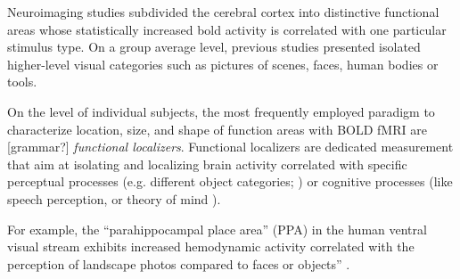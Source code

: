 



Neuroimaging studies subdivided the cerebral cortex into
distinctive functional areas whose statistically increased \ac{bold} activity is
correlated with one particular stimulus type.
On a group average level, previous studies presented isolated higher-level
visual categories such as pictures of scenes, faces, human bodies or tools.



On the level of individual subjects, the most frequently employed paradigm to
characterize location, size, and shape of function areas with BOLD fMRI are
[grammar?] \textit{functional localizers}.
Functional localizers are dedicated measurement that aim at isolating and
localizing brain activity correlated with specific perceptual processes (e.g.
different object categories; \citet{kanwisher1997ffa}) or cognitive processes
(like speech perception, \citet{fernandez2001language} or theory of mind
\citet{spunt2014validating}).

%
For example, the ``parahippocampal place area'' (PPA) in the human ventral
visual stream exhibits increased hemodynamic activity correlated with the
perception of landscape photos compared to faces or objects''
\citep{haeusler2022processing}.

